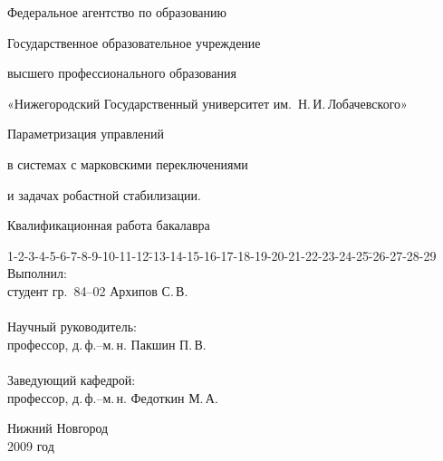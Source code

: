 
\begin{titlepage}
	\begin{center}
		\par Федеральное агентство по образованию\vspace{0.7mm}
		\par Государственное образовательное учреждение\vspace{0.7mm}
		\par высшего профессионального образования\vspace{1.5mm}
		\par «Нижегородский Государственный университет им.~Н.\,И.\,Лобачевского»
		\vspace{1cm}
		{\fontsize{18pt}{9mm}  \selectfont
			\par Параметризация управлений
			\par в системах с марковскими переключениями\vspace{3mm}
			\par и задачах робастной стабилизации.
		}
		\vspace{2cm}
		\par {\large Квалификационная работа бакалавра}
	\end{center}
	\vspace{2cm}
	\begin{tabbing}
		1-2-3-4-5-6-7-8-9-10-11-12\=-13-14-15-16-17-18-19-20-21-22-23-24-25\=-26-27-28-29 \kill
		{\fontsize{10pt}{10pt} \selectfont Выполнил:}                 \>                      \>                 \\
		{\fontsize{10pt}{10pt} \selectfont студент гр.~84--02}        \>                      \> {\fontsize{10pt}{10pt} \selectfont Архипов С.\,В.}  \\
		\\
		{\fontsize{10pt}{10pt} \selectfont Научный руководитель:}     \>                      \>                 \\
		{\fontsize{10pt}{10pt} \selectfont профессор, д.\,ф.--м.\,н.} \>                      \> {\fontsize{10pt}{10pt} \selectfont Пакшин П.\,В.}   \\
		\\
		{\fontsize{10pt}{10pt} \selectfont Заведующий кафедрой:}     \>                      \>                 \\
		{\fontsize{10pt}{10pt} \selectfont профессор, д.\,ф.--м.\,н.} \>                      \> {\fontsize{10pt}{10pt} \selectfont Федоткин М.\,А.}
	\end{tabbing}
	\vspace{3cm}
	\begin{center} {\fontsize{10pt}{3mm}  \selectfont
		Нижний Новгород \\
		2009 год
	} \end{center}
\end{titlepage}
